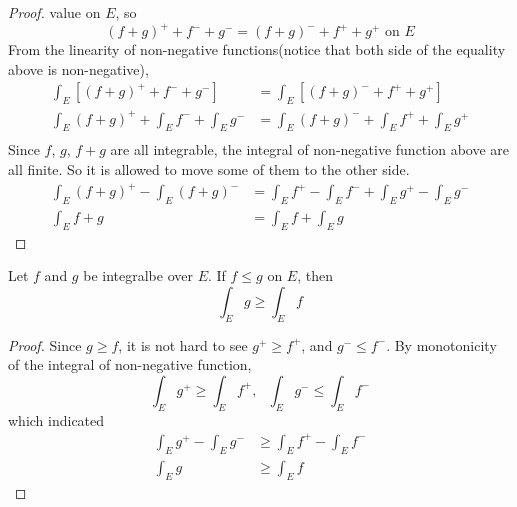 \documentclass[lang=en, 12pt]{elegantbook}
\begin{document}
\begin{proof}
        value on $E$, so 
            \begin{equation*}
                (f+g)^+ + f^- +g^-  = (f+g)^- + f^+  + g^+ \mbox{ on } E
            \end{equation*}
            From the linearity of non-negative functions(notice that both side of the equality above is non-negative), 
            \begin{equation*}
                \begin{aligned}
                    \int_E [(f+g)^+ + f^- +g^-]  &= \int_E [(f+g)^- + f^+  + g^+] \\
                    \int_E (f+g)^+ + \int_E f^- +\int_E g^-  &= \int_E (f+g)^- + \int_E f^+  + \int_E g^+\\
                \end{aligned}
            \end{equation*}
            Since $f$, $g$, $f+g$ are all integrable, the integral of non-negative function above are all finite. So it is allowed to 
        move some of them to the other side.
        \begin{equation*}
            \begin{aligned}
                \int_E (f+g)^+ - \int_E (f+g)^-  &= \int_E f^+ - \int_E f^- + \int_E g^+   - \int_E g^-\\
                \int_E f+g &= \int_E f + \int_E g 
            \end{aligned}
        \end{equation*} 
        \end{proof} 
        \begin{theorem}[Monotonicity]
            Let $f$ and $g$ be integralbe over $E$. If $f\leq g$ on $E$, then 
            \begin{equation*}
                \int_E g \geq \int_E f
            \end{equation*}
        \end{theorem}
        \begin{proof}
            Since $g \geq f$, it is not hard to see $g^+ \geq f^+$, and $g^- \leq f^-$. By monotonicity of the integral of non-negative
        function, 
        $$\int_E g^+ \geq \int_E f^+, \ \ \ \int_E g^- \leq \int_E f^-$$
        which indicated 
        \begin{equation*}
            \begin{aligned}
                \int_E g^+ - \int_E g^- &\geq \int_E f^+ - \int_E f^-\\
                \int_E g &\geq \int_E f
            \end{aligned}
        \end{equation*} 
        \end{proof}
\end{document}
